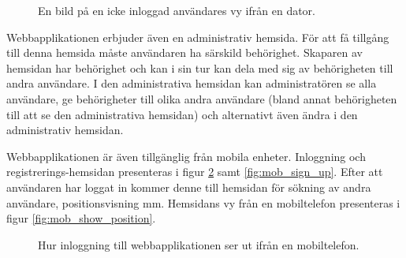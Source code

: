 \documentclass[a4paper,12pt]{article}
\begin{document}
 \begin{figure}[H]
   \centering
   \caption{En bild på en icke inloggad användares vy ifrån en dator.}
   \label{fig:comp_not_logged_in}
 \end{figure}

 Webbapplikationen erbjuder även en administrativ hemsida. För att få tillgång till denna hemsida måste användaren ha särskild behörighet. Skaparen av hemsidan har behörighet och kan i sin tur kan dela med sig av behörigheten till andra användare. I den administrativa hemsidan kan administratören se alla användare, ge behörigheter till olika andra användare (bland annat behörigheten till att se den administrativa hemsidan) och alternativt även ändra i den administrativ hemsidan.

 Webbapplikationen är även tillgänglig från mobila enheter. Inloggning och registrerings-hemsidan presenteras i figur \ref{fig:mob_login} samt \ref{fig:mob_sign_up}. Efter att användaren har loggat in kommer denne till hemsidan för sökning av andra användare, positionsvisning mm. Hemsidans vy från en mobiltelefon presenteras i figur \ref{fig:mob_show_position}.

 \begin{figure}[H]
   \centering
   \caption{Hur inloggning till webbapplikationen ser ut ifrån en mobiltelefon.}
   \label{fig:mob_login}
 \end{figure}
\end{document}
